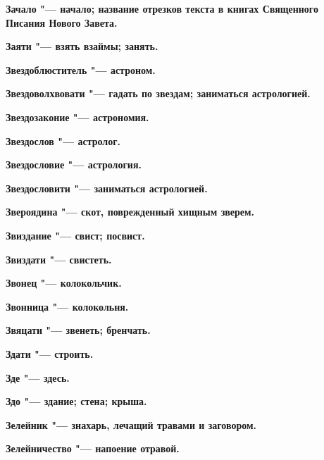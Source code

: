 \begin{mymulticols}{2}
\bfseries Зачало\normalfont{} "--- начало; название отрезков текста в книгах Священного Писания Нового Завета. 




\bfseries Заяти\normalfont{} "--- взять взаймы; занять. 




\bfseries Звездоблюститель\normalfont{} "--- астроном. 




\bfseries Звездоволхвовати\normalfont{} "--- гадать по звездам; заниматься астрологией. 




\bfseries Звездозаконие\normalfont{} "--- астрономия. 




\bfseries Звездослов\normalfont{} "--- астролог. 




\bfseries Звездословие\normalfont{} "--- астрология. 




\bfseries Звездословити\normalfont{} "--- заниматься астрологией. 




\bfseries Звероядина\normalfont{} "--- скот, поврежденный хищным зверем. 




\bfseries Звиздание\normalfont{} "--- свист; посвист. 




\bfseries Звиздати\normalfont{} "--- свистеть. 




\bfseries Звонец\normalfont{} "--- колокольчик. 




\bfseries Звонница\normalfont{} "--- колокольня. 




\bfseries Звяцати\normalfont{} "--- звенеть; бренчать. 




\bfseries Здати\normalfont{} "--- строить. 




\bfseries Зде\normalfont{} "--- здесь. 




\bfseries Здо\normalfont{} "--- здание; стена; крыша. 




\bfseries Зелейник\normalfont{} "--- знахарь, лечащий травами и заговором. 




\bfseries Зелейничество\normalfont{} "--- напоение отравой. 





\end{mymulticols}
